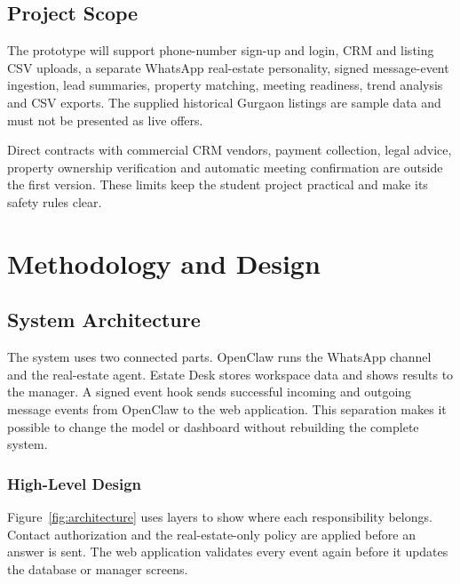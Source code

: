 \documentclass{tietreport}
\begin{document}
\section{Project Scope}

The prototype will support phone-number sign-up and login, CRM and listing CSV
uploads, a separate WhatsApp real-estate personality, signed message-event
ingestion, lead summaries, property matching, meeting readiness, trend analysis
and CSV exports. The supplied historical Gurgaon listings are sample data and
must not be presented as live offers.

Direct contracts with commercial CRM vendors, payment collection, legal advice,
property ownership verification and automatic meeting confirmation are outside
the first version. These limits keep the student project practical and make its
safety rules clear.

\chapter{Methodology and Design}

\section{System Architecture}

The system uses two connected parts. OpenClaw runs the WhatsApp channel and the
real-estate agent. Estate Desk stores workspace data and shows results to the
manager. A signed event hook sends successful incoming and outgoing message
events from OpenClaw to the web application. This separation makes it possible
to change the model or dashboard without rebuilding the complete system.

\subsection{High-Level Design}

Figure~\ref{fig:architecture} uses layers to show where each responsibility
belongs. Contact authorization and the real-estate-only policy are applied
before an answer is sent. The web application validates every event again before
it updates the database or manager screens.
\end{document}
